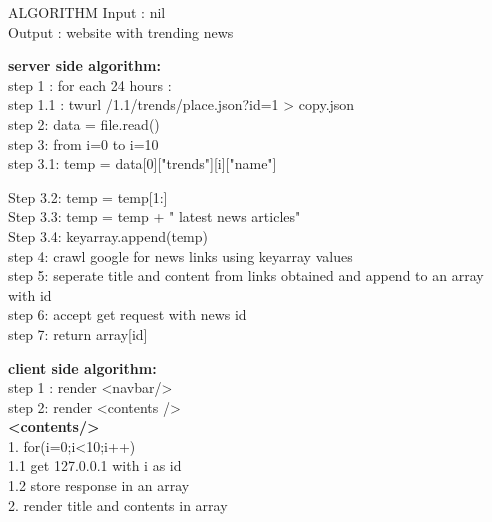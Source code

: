 \documentclass[20pt]{beamer}
\begin{document}
\begin{frame}{ALGORITHM}
	\footnotesize
	Input : nil \\
	Output :  website with trending news
	
	\footnotesize
	\textbf{server side algorithm: }\\
	step 1 :  for each 24 hours : \\
	\hspace{.2cm} step 1.1 : twurl /1.1/trends/place.json?id=1 > copy.json\\
	step 2:  data = file.read() \\
	step 3:  from i=0 to i=10 \\
	\hspace{.2cm}step 3.1: temp = data[0]["trends"][i]["name"]\\   
\end{frame}

\begin{frame}
\footnotesize

\hspace{.2cm}Step 3.2:  temp = temp[1:]  \\
\hspace{.2cm}Step 3.3:  temp = temp + " latest news articles"\\
\hspace{.2cm}Step 3.4:  keyarray.append(temp)  \\
step 4: crawl google for news links using keyarray values\\
step 5: seperate title and content from links obtained  and append to an array with id \\
step 6: accept get request with news id\\
step 7: return array[id]

\end{frame}

\begin{frame}	
	\footnotesize
	\textbf{client side algorithm: }\\
	step 1 : render <navbar/> \\	
	step 2:  render <contents /> \\
	\vspace{5mm}
	\textbf{<contents/>}\\
	\vspace{5mm}
	1. for(i=0;i<10;i++)\\
	\hspace{.2cm}1.1 get 127.0.0.1 with i as id\\
	\hspace{.2cm}1.2 store response in an array\\
	2. render title and contents in array
	
  
\end{frame}
\end{document}
